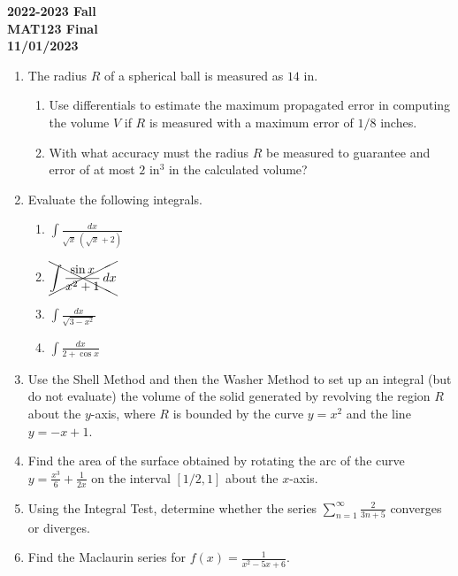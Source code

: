 \documentclass[a4paper, 12pt]{article}
\begin{document}
\pagestyle{empty}

\begin{center}
\textbf{2022-2023 Fall\\MAT123 Final\\11/01/2023}
\end{center}

\begin{enumerate}[leftmargin=*,label=\textbf{\arabic*.}]
\item The radius $R$ of a spherical ball is measured as $14$ in.

\begin{enumerate}[leftmargin=*,label=\textbf{\alph*.}]
\item Use differentials to estimate the maximum propagated error in computing the volume $V$ if $R$ is measured with a maximum error of $1/8$ inches.

\item With what accuracy must the radius $R$ be measured to guarantee and error of at most $2$ in$^3$ in the calculated volume?
\end{enumerate}

\item Evaluate the following integrals.
\begin{enumerate}[leftmargin=*,label=\textbf{\alph*.}]
\item $\displaystyle\int\frac{dx}{\sqrt x\,\left(\sqrt x+2\right)}$
\item $\xcancel{\displaystyle\int\frac{\sin x}{x^2+1}\,dx}$
\item $\displaystyle\int\frac{dx}{\sqrt{3-x^2}}$
\item $\displaystyle\int\frac{dx}{2+\cos x}$
\end{enumerate}

\item Use the Shell Method and then the Washer Method to set up an integral (but do not evaluate) the volume of the solid generated by revolving the region $R$ about the $y$-axis, where $R$ is bounded by the curve $y=x^2$ and the line $y=-x+1$.

\item Find the area of the surface obtained by rotating the arc of the curve $\displaystyle y=\frac{x^3}6+\frac1{2x}$ on the interval $[1/2,1]$ about the $x$-axis.

\item Using the Integral Test, determine whether the series
$\displaystyle\sum_{n=1}^\infty\frac2{3n+5}$
converges or diverges.

\item Find the Maclaurin series for $\displaystyle f(x)=\frac1{x^2-5x+6}$.

\end{enumerate}
\end{document}
